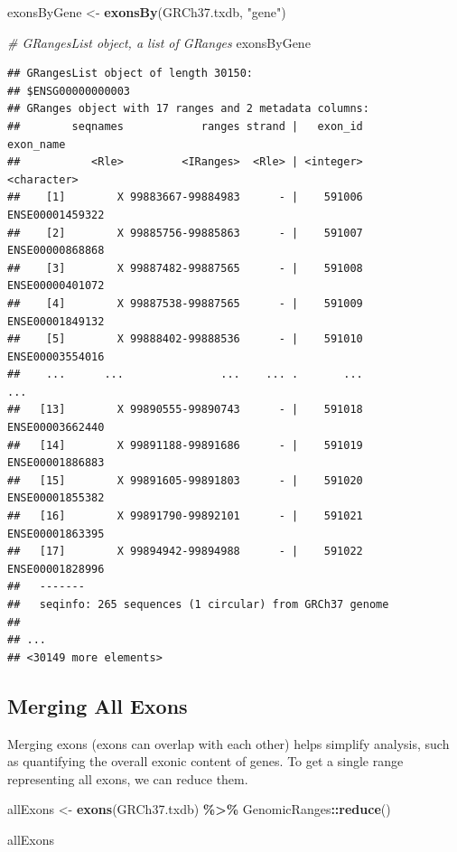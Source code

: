 \documentclass[
]{book}
\newenvironment{Shaded}{\begin{snugshade}}{\end{snugshade}}
\newcommand{\CommentTok}[1]{\textcolor[rgb]{0.56,0.35,0.01}{\textit{#1}}}
\newcommand{\FunctionTok}[1]{\textcolor[rgb]{0.13,0.29,0.53}{\textbf{#1}}}
\newcommand{\NormalTok}[1]{#1}
\newcommand{\OtherTok}[1]{\textcolor[rgb]{0.56,0.35,0.01}{#1}}
\newcommand{\SpecialCharTok}[1]{\textcolor[rgb]{0.81,0.36,0.00}{\textbf{#1}}}
\newcommand{\StringTok}[1]{\textcolor[rgb]{0.31,0.60,0.02}{#1}}
\begin{document}
\begin{Shaded}
\begin{Highlighting}[]
\NormalTok{exonsByGene }\OtherTok{\textless{}{-}} \FunctionTok{exonsBy}\NormalTok{(GRCh37.txdb, }\StringTok{"gene"}\NormalTok{) }

\CommentTok{\# GRangesList object, a list of GRanges }
\NormalTok{exonsByGene}
\end{Highlighting}
\end{Shaded}

\begin{verbatim}
## GRangesList object of length 30150:
## $ENSG00000000003
## GRanges object with 17 ranges and 2 metadata columns:
##        seqnames            ranges strand |   exon_id       exon_name
##           <Rle>         <IRanges>  <Rle> | <integer>     <character>
##    [1]        X 99883667-99884983      - |    591006 ENSE00001459322
##    [2]        X 99885756-99885863      - |    591007 ENSE00000868868
##    [3]        X 99887482-99887565      - |    591008 ENSE00000401072
##    [4]        X 99887538-99887565      - |    591009 ENSE00001849132
##    [5]        X 99888402-99888536      - |    591010 ENSE00003554016
##    ...      ...               ...    ... .       ...             ...
##   [13]        X 99890555-99890743      - |    591018 ENSE00003662440
##   [14]        X 99891188-99891686      - |    591019 ENSE00001886883
##   [15]        X 99891605-99891803      - |    591020 ENSE00001855382
##   [16]        X 99891790-99892101      - |    591021 ENSE00001863395
##   [17]        X 99894942-99894988      - |    591022 ENSE00001828996
##   -------
##   seqinfo: 265 sequences (1 circular) from GRCh37 genome
## 
## ...
## <30149 more elements>
\end{verbatim}

\hypertarget{merging-all-exons}{%
\subsection{Merging All Exons}\label{merging-all-exons}}

Merging exons (exons can overlap with each other) helps simplify analysis, such as quantifying the overall exonic content of genes. To get a single range representing all exons, we can reduce them.

\begin{Shaded}
\begin{Highlighting}[]
\NormalTok{allExons }\OtherTok{\textless{}{-}} \FunctionTok{exons}\NormalTok{(GRCh37.txdb) }\SpecialCharTok{\%\textgreater{}\%} 
\NormalTok{  GenomicRanges}\SpecialCharTok{::}\FunctionTok{reduce}\NormalTok{()}

\NormalTok{allExons}
\end{Highlighting}
\end{Shaded}
\end{document}

